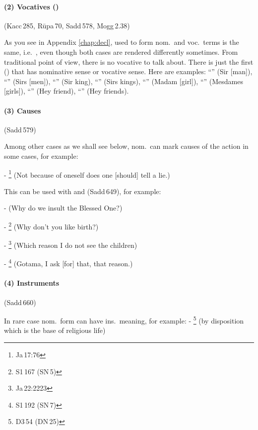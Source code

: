 \paragraph*{(2) Vocatives ()} (Kacc\,285, R\=upa\,70, Sadd\,578, Mogg\,2.38)\par
As you see in Appendix \ref{chap:decl},  used to form nom.\ and voc.\ terms is the same, i.e.\ , even though both cases are rendered differently sometimes. From traditional point of view, there is no vocative  to talk about. There is just the first ()  that has nominative sense or vocative sense. Here are examples: ``'' (Sir [man]), ``'' (Sirs [men]), ``'' (Sir king), ``'' (Sirs kings), ``'' (Madam [girl]), ``'' (Mesdames [girls]), ``'' (Hey friend), ``'' (Hey friends).

\paragraph*{(3) Causes} (Sadd\,579)\par Among other cases as we shall see below, nom.\ can mark causes of the action in some cases, for example:\par
- \footnote{Ja\,17:76} (Not because of oneself does one [should] tell a lie.)\par
This can be used with  and  (Sadd\,649), for example:\par
-  (Why do we insult the Blessed One?)\par
- \footnote{S1\,167 (SN\,5)} (Why don't you like birth?)\par
- \footnote{Ja\,22:2223} (Which reason I do not see the children)\par
- \footnote{S1\,192 (SN\,7)} (Gotama, I ask [for] that, that reason.)\par

\paragraph*{(4) Instruments} (Sadd\,660)\par 
In rare case nom.\ form can have ins.\ meaning, for example:
- \footnote{D3\,54 (DN\,25)} (by disposition which is the base of religious life)\par

